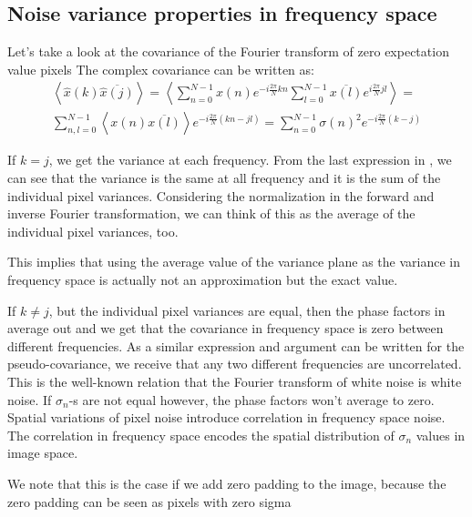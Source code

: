 \subsection{Noise variance properties in frequency space\label{sec:noise_freq_space}}
%
\par Let's take a look at the covariance of the Fourier transform of zero
expectation value pixels The complex covariance can be written as:
\begin{equation}
\begin{split}
\left\langle \hat{x}(k) \overline{\hat{x}(j)} \right\rangle =
\left\langle \sum_{n=0}^{N-1} x(n) e^{-i\frac{2\pi}{N}kn}
 \sum_{l=0}^{N-1} \overline{x(l)} e^{i\frac{2\pi}{N}jl} \right\rangle = \\
\sum_{n,l=0}^{N-1} \left\langle x(n)\overline{x(l)}\right\rangle e^{-i\frac{2\pi}{N}(kn - jl)} =
\sum_{n=0}^{N-1} \sigma(n)^2 e^{-i\frac{2\pi}{N}(k-j)}
\label{eq:freq_cov}
\end{split}
\end{equation}
%
\par If \(k=j\), we get the variance at each frequency. From the last
expression in , we can see that the variance is the same
at all frequency and it is the sum of the individual pixel
variances. Considering the normalization in the forward and inverse Fourier
transformation, we can think of this as the average of the individual pixel
variances, too.
%
\par This implies that using the average value of the variance plane as the
variance in frequency space is actually not an approximation but the exact
value.
%
\par If \(k\neq j\), but the individual pixel variances are equal, then the
phase factors in  average out and we get that the
covariance in frequency space is zero between different frequencies. As a
similar expression and argument can be written for the pseudo-covariance, we
receive that any two different frequencies are uncorrelated. This is the
well-known relation that the Fourier transform of white noise is white noise. If
\(\sigma_n\)-s are not equal however, the phase factors won't average to
zero. Spatial variations of pixel noise introduce correlation in frequency
space noise. The correlation in frequency space encodes the spatial
distribution of \(\sigma_n\) values in image space.
%
\par We note that this is the case if we add zero padding to the
image, because the zero padding can be seen as pixels with zero sigma
